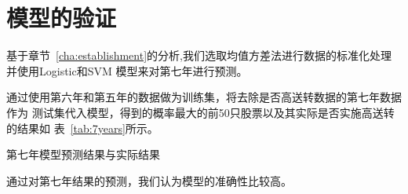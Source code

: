 \documentclass[../main]{subfiles}
\begin{document}
\chapter{模型的验证}%
\label{cha:validation}

基于章节~\ref{cha:establishment}的分析,我们选取均值方差法进行数据的标准化处理
并使用Logistic和SVM 模型来对第七年进行预测。

通过使用第六年和第五年的数据做为训练集，将去除是否高送转数据的第七年数据作为
测试集代入模型，得到的概率最大的前50只股票以及其实际是否实施高送转的结果如
表~\ref{tab:7years}所示。

\begin{table}[htpb]
  \centering
  \caption{第七年模型预测结果与实际结果}%
  \label{tab:7years}
  \scriptsize
\end{table}

通过对第七年结果的预测，我们认为模型的准确性比较高。
\end{document}
